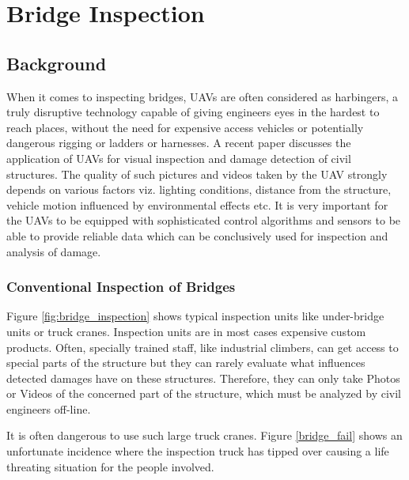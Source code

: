 \documentclass[12pt]{report}
\begin{document}
\chapter{Bridge Inspection}
\section{Background}
When it comes to inspecting bridges, UAVs are often considered as harbingers, a truly disruptive technology capable of giving engineers eyes in the hardest to reach places, without the need for expensive access vehicles or potentially dangerous rigging or ladders or harnesses. A recent paper  \cite{morgenthal2014quality} discusses the application of UAVs for visual inspection and damage detection of civil structures. The quality of such pictures and videos taken by the UAV strongly depends on various factors viz. lighting conditions, distance from the structure, vehicle motion influenced by environmental effects etc. It is very important for the UAVs to be equipped with sophisticated control algorithms and sensors to be able to provide reliable data which can be conclusively used for inspection and analysis of damage.

\subsection{Conventional Inspection of Bridges}
Figure \ref{fig:bridge_inspection} shows typical inspection units like under-bridge units or truck cranes. Inspection units are in most cases expensive custom products. Often, specially trained staff, like industrial climbers, can get access to special parts of the structure but they can rarely evaluate what influences detected damages have on these structures. Therefore, they can only take Photos or Videos of the concerned part of the structure, which must be analyzed by civil engineers off-line.\par It is often dangerous to use such large truck cranes. Figure \ref{bridge_fail} shows an unfortunate incidence where the inspection truck has tipped over causing a life threating situation for the people involved.\par
 
\end{document}
